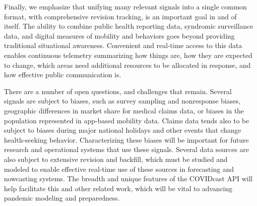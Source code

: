 \documentclass[9pt,twocolumn,twoside,lineno]{pnas-new}
\begin{document}
Finally, we emphasize that unifying many relevant signals into a single common
format, with comprehensive revision tracking, is an important goal in and of 
itself. The ability to combine public health reporting data, syndromic
surveillance data, and digital measures of mobility and behaviors goes beyond
providing traditional situational awareness.  Convenient and real-time access to
this data enables continuous telemetry summarizing how things are, how they are
expected to change, which areas need additional resources to be allocated in
response, and how effective public communication is. 

There are a number of open questions, and challenges that remain. Several
signals are subject to biases, such as survey sampling and nonresponse biases,
geographic differences in market share for medical claims data, or biases in the
population represented in app-based mobility data.
Claims data tends also to be subject to biases during major national holidays
and other events that change health-seeking behavior. Characterizing these
biases will be important for future research and operational systems that use
these signals.  Several data sources are also subject to extensive revision and
backfill, which must be studied and modeled to enable effective real-time use of
these sources in forecasting and nowcasting systems. The breadth and unique
features of the COVIDcast API will help facilitate this and other related work,
which will be vital to advancing pandemic modeling and preparedness.


\showacknow{} %


\end{document}
